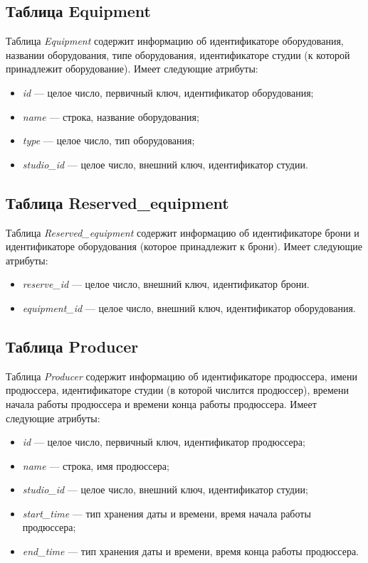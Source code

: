 \subsection{Таблица Equipment}
Таблица \textit{Equipment} содержит информацию об идентификаторе оборудования, названии оборудования, типе оборудования, идентификаторе студии (к которой принадлежит оборудование).
Имеет следующие атрибуты:
\begin{itemize}
	\item \textit{id} --- целое число, первичный ключ, идентификатор оборудования;
	\item \textit{name} --- строка, название оборудования;
	\item \textit{type} --- целое число, тип оборудования;
	\item \textit{studio\_id} --- целое число, внешний ключ, идентификатор студии.
\end{itemize}
\subsection{Таблица Reserved\_equipment}
Таблица \textit{Reserved\_equipment} содержит информацию об идентификаторе брони и идентификаторе оборудования (которое принадлежит к брони).
Имеет следующие атрибуты:
\begin{itemize}
	\item \textit{reserve\_id} --- целое число, внешний ключ, идентификатор брони.
	\item \textit{equipment\_id} --- целое число, внешний ключ, идентификатор оборудования.
\end{itemize}
\subsection{Таблица Producer}
Таблица \textit{Producer} содержит информацию об идентификаторе продюссера, имени продюссера, идентификаторе студии (в которой числится продюссер), времени начала работы продюссера и времени конца работы продюссера.
Имеет следующие атрибуты:
\begin{itemize}
	\item \textit{id} --- целое число, первичный ключ, идентификатор продюссера;
	\item \textit{name} --- строка, имя продюссера;
	\item \textit{studio\_id} --- целое число, внешний ключ, идентификатор студии;
	\item \textit{start\_time} --- тип хранения даты и времени, время начала работы продюссера;
	\item \textit{end\_time} --- тип хранения даты и времени, время конца работы продюссера.
\end{itemize}
